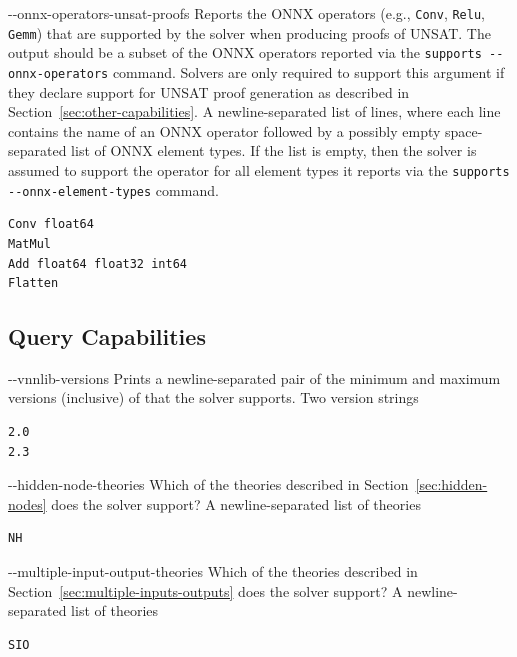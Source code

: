 \clOutputOption
{-{}-onnx-operators-unsat-proofs}
{Reports the ONNX operators (e.g., \texttt{Conv}, \texttt{Relu}, \texttt{Gemm}) that are supported by the solver when producing proofs of UNSAT. The output should be a subset of the ONNX operators reported via the \texttt{supports -{}-onnx-operators} command. Solvers are only required to support this argument if they declare support for UNSAT proof generation as described in Section~\ref{sec:other-capabilities}.
}
{A newline-separated list of lines, where each line contains the name of an ONNX operator followed by a possibly empty space-separated list of ONNX element types.  If the list is empty, then the solver is assumed to support the operator for all element types it reports via the \texttt{supports -{}-onnx-element-types} command.
}
\begin{lstlisting}[style=bash]
%*\exampleSolver* supports --onnx-operators-unsat-proofs
Conv float64
MatMul
Add float64 float32 int64
Flatten
\end{lstlisting}

\subsection{\vnnlib{} Query Capabilities}
\label{sec:query-capabilities}

\clOutputOption
{-{}-vnnlib-versions}
{Prints a newline-separated pair of the minimum and maximum versions (inclusive) of \vnnlib{} that the solver supports.}
{Two version strings}
\begin{lstlisting}[style=bash]
%*\exampleSolver* supports --vnnlib-versions
2.0
2.3
\end{lstlisting}

\clOutputOption
{-{}-hidden-node-theories}
{Which of the \hiddenNodes{} theories described in Section~\ref{sec:hidden-nodes} does the solver support?}
{A newline-separated list of theories}
\begin{lstlisting}[style=bash]
%*\exampleSolver* supports --hidden-node-theories
NH
\end{lstlisting}

\clOutputOption
{-{}-multiple-input-output-theories}
{Which of the \multiIO{} theories described in Section~\ref{sec:multiple-inputs-outputs} does the solver support?}
{A newline-separated list of theories}
\begin{lstlisting}[style=bash]
%*\exampleSolver* supports --multiple-input-output-theories
SIO
\end{lstlisting}

